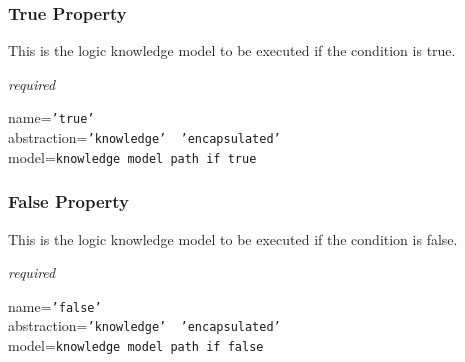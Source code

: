 \subsubsection{True Property}

This is the logic knowledge model to be executed if the condition is true.

\emph{required}

name=\texttt{'true'}\\
abstraction=\texttt{'knowledge' \vline\ 'encapsulated'}\\
model=\texttt{knowledge model path if true}

\subsubsection{False Property}

This is the logic knowledge model to be executed if the condition is false.

\emph{required}

name=\texttt{'false'}\\
abstraction=\texttt{'knowledge' \vline\ 'encapsulated'}\\
model=\texttt{knowledge model path if false}
